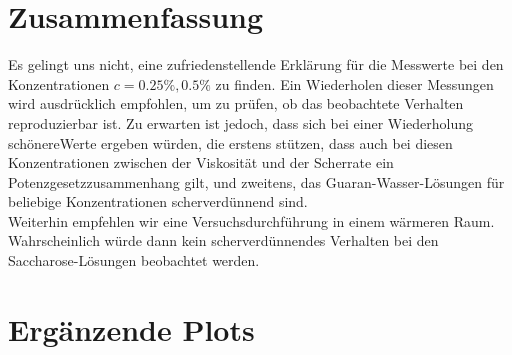 \documentclass[11pt,a4paper,oneside]{scrartcl}
\begin{document}

\section{Zusammenfassung}

Es gelingt uns nicht, eine zufriedenstellende Erklärung für die Messwerte bei den Konzentrationen $c=0.25\%,0.5\%$ zu finden. Ein Wiederholen dieser Messungen wird ausdrücklich empfohlen, um zu prüfen, ob das beobachtete Verhalten reproduzierbar ist. Zu erwarten ist jedoch, dass sich bei einer Wiederholung \glqq schönere\Grqq Werte ergeben würden, die erstens stützen, dass auch bei diesen Konzentrationen zwischen der Viskosität und der Scherrate ein Potenzgesetzzusammenhang gilt, und zweitens, das Guaran-Wasser-Lösungen für beliebige Konzentrationen scherverdünnend sind. \\
Weiterhin empfehlen wir eine Versuchsdurchführung in einem wärmeren Raum. Wahrscheinlich würde dann kein scherverdünnendes Verhalten bei den Saccharose-Lösungen beobachtet werden.
\newpage

 

\appendix


\section{Ergänzende Plots}
\end{document}
